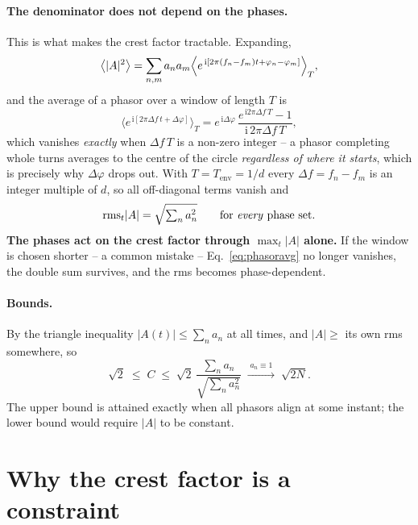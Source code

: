 \documentclass[11pt,a4paper]{article}
\newcommand{\crest}{\ensuremath{C}}
\begin{document}
\paragraph{The denominator does not depend on the phases.}
This is what makes the crest factor tractable. Expanding,
\begin{equation}
  \bigl\langle |A|^2 \bigr\rangle
  = \sum_{n,m} a_n a_m \Bigl\langle
      e^{\,\mathrm{i}\left[2\pi (f_n-f_m)t + \varphi_n-\varphi_m\right]}
    \Bigr\rangle_T ,
\end{equation}
and the average of a phasor over a window of length $T$ is
\begin{equation}
  \bigl\langle e^{\,\mathrm{i}[2\pi\Delta f\,t+\Delta\varphi]}\bigr\rangle_T
  = e^{\,\mathrm{i}\Delta\varphi}\,
    \frac{e^{\,\mathrm{i}2\pi\Delta f\,T}-1}{\mathrm{i}\,2\pi\Delta f\,T} ,
  \label{eq:phasoravg}
\end{equation}
which vanishes \emph{exactly} when $\Delta f\,T$ is a non-zero integer -- a
phasor completing whole turns averages to the centre of the circle
\emph{regardless of where it starts}, which is precisely why
$\Delta\varphi$ drops out. With $T = T_\mathrm{env} = 1/d$ every
$\Delta f = f_n-f_m$ is an integer multiple of $d$, so all off-diagonal
terms vanish and
\begin{equation}
  \mathrm{rms}_t|A| = \sqrt{\textstyle\sum_n a_n^2} \qquad
  \text{for \emph{every} phase set.}
  \label{eq:rmsphase}
\end{equation}
\textbf{The phases act on the crest factor through $\max_t|A|$ alone.} If the
window is chosen shorter -- a common mistake -- Eq.~\eqref{eq:phasoravg} no
longer vanishes, the double sum survives, and the rms becomes
phase-dependent.

\paragraph{Bounds.} By the triangle inequality $|A(t)|\le\sum_n a_n$ at all
times, and $|A|\ge$ its own rms somewhere, so
\begin{equation}
  \sqrt2 \;\le\; \crest \;\le\; \sqrt2\,
  \frac{\sum_n a_n}{\sqrt{\sum_n a_n^2}} \;\xrightarrow{\;a_n\equiv1\;}\;
  \sqrt{2N} .
  \label{eq:bounds}
\end{equation}
The upper bound is attained exactly when all phasors align at some instant;
the lower bound would require $|A|$ to be constant.

\section{Why the crest factor is a constraint}\label{sec:constraint}
\end{document}
